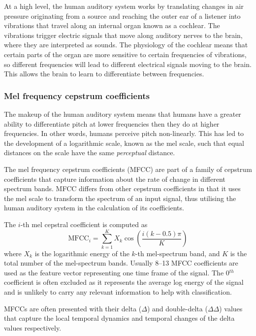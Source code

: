 At a high level, the human auditory system works by translating changes in air
pressure originating from a source and reaching the outer ear of a listener
into vibrations that travel along an internal organ known as a cochlear. The
vibrations trigger electric signals that move along auditory nerves to the
brain, where they are interpreted as sounds. The physiology of the cochlear
means that certain parts of the organ are more sensitive to certain frequencies
of vibrations, so different frequencies will lead to different electrical
signals moving to the brain. This allows the brain to learn to differentiate
between frequencies.

\subsubsection{Mel frequency cepstrum coefficients}

The makeup of the human auditory system means that humans have a greater ability
to differentiate pitch at lower frequencies then they do at higher frequencies.
In other words, humans perceive pitch non-linearly. This has led to the
development of a logarithmic scale, known as the mel scale, such that equal
distances on the scale have the same \textit{perceptual} distance.

The mel frequency cepstrum coefficients (MFCC) are part of a family of cepstrum
coefficients that capture information about the rate of change in different
spectrum bands. MFCC differs from other cepstrum coefficients in that it uses the
mel scale to transform the spectrum of an input signal, thus utilising the human
auditory system in the calculation of its coefficients.

The $i$-th mel cepstral coefficient is computed as~\cite{davis1980comparison}
\begin{equation}
\text{MFCC}_i = \sum_{k=1}^{K} X_k \cos \left(
  \frac{i(k-0.5)\pi}{K}
\right)
\end{equation}
where $X_k$ is the logarithmic energy of the $k$-th mel-spectrum band, and $K$
is the total number of the mel-spectrum bands. Usually 8--13 MFCC coefficients
are used as the feature vector representing one time frame of the signal. The
0$^{th}$ coefficient is often excluded as it represents the average log energy
of the signal and is unlikely to carry any relevant information to help with
classification.

MFCCs are often presented with their delta ($\Delta$) and double-delta
($\Delta\Delta$) values that capture the local temporal dynamics and temporal
changes of the delta values respectively.

